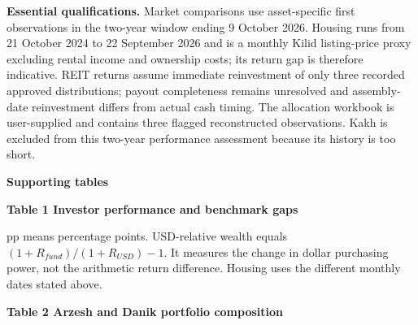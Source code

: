 \documentclass[11pt,a4paper]{article}
\begin{document}
\textbf{Essential qualifications.} Market comparisons use asset-specific first observations in the two-year window ending 9 October 2026. Housing runs from 21 October 2024 to 22 September 2026 and is a monthly Kilid listing-price proxy excluding rental income and ownership costs; its return gap is therefore indicative. REIT returns assume immediate reinvestment of only three recorded approved distributions; payout completeness remains unresolved and assembly-date reinvestment differs from actual cash timing. The allocation workbook is user-supplied and contains three flagged reconstructed observations. Kakh is excluded from this two-year performance assessment because its history is too short.

\newpage

{\Large\bfseries Supporting tables}\par

\textbf{Table 1 Investor performance and benchmark gaps}

\begin{center}
\small
{}
\end{center}

{\small pp means percentage points. USD-relative wealth equals $(1+R_{fund})/(1+R_{USD})-1$. It measures the change in dollar purchasing power, not the arithmetic return difference. Housing uses the different monthly dates stated above.}\par

\textbf{Table 2 Arzesh and Danik portfolio composition}

\begin{center}
\small
{}
\end{center}
\end{document}
